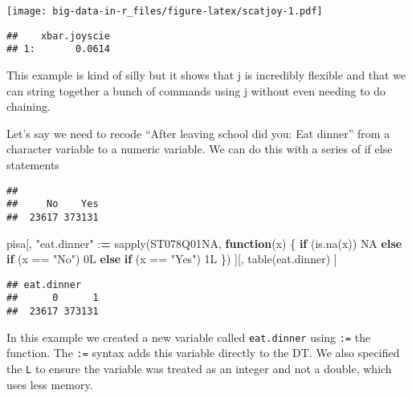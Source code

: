 \documentclass[
]{book}
\newenvironment{Shaded}{\begin{snugshade}}{\end{snugshade}}
\newcommand{\ConstantTok}[1]{\textcolor[rgb]{0.00,0.00,0.00}{#1}}
\newcommand{\ControlFlowTok}[1]{\textcolor[rgb]{0.13,0.29,0.53}{\textbf{#1}}}
\newcommand{\ErrorTok}[1]{\textcolor[rgb]{0.64,0.00,0.00}{\textbf{#1}}}
\newcommand{\FunctionTok}[1]{\textcolor[rgb]{0.00,0.00,0.00}{#1}}
\newcommand{\NormalTok}[1]{#1}
\newcommand{\SpecialCharTok}[1]{\textcolor[rgb]{0.00,0.00,0.00}{#1}}
\newcommand{\StringTok}[1]{\textcolor[rgb]{0.31,0.60,0.02}{#1}}
\begin{document}
\texttt{[image: big-data-in-r\_files/figure-latex/scatjoy-1.pdf]}

\begin{verbatim}
##    xbar.joyscie
## 1:       0.0614
\end{verbatim}

This example is kind of silly but it shows that j is incredibly flexible and that we can string together a bunch of commands using j without even needing to do chaining.

Let's say we need to recode ``After leaving school did you: Eat dinner'' from a character variable to a numeric variable. We can do this with a series of if else statements

\begin{Shaded}
\end{Shaded}

\begin{verbatim}
## 
##     No    Yes 
##  23617 373131
\end{verbatim}

\begin{Shaded}
\begin{Highlighting}[]
\NormalTok{pisa[,}
     \StringTok{"eat.dinner"} \SpecialCharTok{:}\ErrorTok{=} \FunctionTok{sapply}\NormalTok{(ST078Q01NA,}
                            \ControlFlowTok{function}\NormalTok{(x) \{}
                              \ControlFlowTok{if}\NormalTok{ (}\FunctionTok{is.na}\NormalTok{(x)) }\ConstantTok{NA}
                              \ControlFlowTok{else} \ControlFlowTok{if}\NormalTok{ (x }\SpecialCharTok{==} \StringTok{"No"}\NormalTok{) 0L}
                              \ControlFlowTok{else} \ControlFlowTok{if}\NormalTok{ (x }\SpecialCharTok{==} \StringTok{"Yes"}\NormalTok{) 1L}
\NormalTok{                            \})}
\NormalTok{     ][,}
       \FunctionTok{table}\NormalTok{(eat.dinner)}
\NormalTok{       ]}
\end{Highlighting}
\end{Shaded}

\begin{verbatim}
## eat.dinner
##      0      1 
##  23617 373131
\end{verbatim}

In this example we created a new variable called \texttt{eat.dinner} using \texttt{:=} the function. The \texttt{:=} syntax adds this variable directly to the DT. We also specified the \texttt{L} to ensure the variable was treated as an integer and not a double, which uses less memory.
\end{document}
